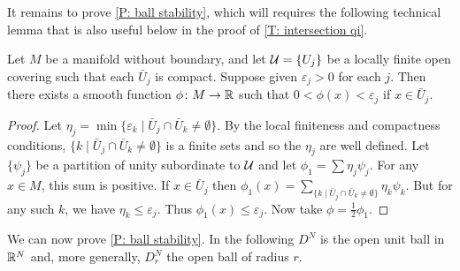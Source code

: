 It remains to prove \cref{P: ball stability}, which will requires the following technical lemma that is also useful below in the proof of \cref{T: intersection qi}.

\begin{lemma}\label{L: minimizer}
	Let $M$ be a manifold without boundary, and let $\mathcal{U} = \{U_j\}$ be a locally finite open covering such that each $\bar U_j$ is compact.
	Suppose given $\varepsilon_j>0$ for each $j$.
	Then there exists a smooth function $\phi \colon M \to \mathbb{R}$ such that $0<\phi(x)<\varepsilon_j$ if $x \in \bar U_j$.
\end{lemma}

\begin{proof}
	Let $\eta_j = \min\{\varepsilon_k \mid \bar U_j \cap \bar U_k\neq \emptyset\}$.
	By the local finiteness and compactness conditions, $\{k \mid \bar U_j \cap \bar U_k\neq \emptyset\}$ is a finite sets and so the $\eta_j$ are well defined.
	Let $\{\psi_j\}$ be a partition of unity subordinate to $\mathcal{U}$ and let $\phi_1 = \sum \eta_j\psi_j$.
	For any $x \in M$, this sum is positive.
	If $x \in \bar U_j$ then $\phi_1(x) = \sum_{\{k \mid \bar U_j \cap \bar U_k\neq \emptyset\}} \eta_k\psi_k$.
	But for any such $k$, we have $\eta_k \leq \varepsilon_j$.
	Thus $\phi_1(x) \leq \varepsilon_j$.
	Now take $\phi = \frac{1}{2}\phi_1$.
\end{proof}

We can now prove \cref{P: ball stability}.
In the following $D^N$ is the open unit ball in $\mathbb{R}^N$ and, more generally, $D^N_r$ the open ball of radius $r$.

